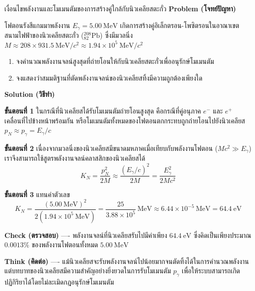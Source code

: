 \begin{psctbox}{เงื่อนไขพลังงานและโมเมนตัมของการสร้างคู่ใกล้กับนิวเคลียสตะกั่ว}
\textbf{Problem (โจทย์ปัญหา)}

โฟตอนรังสีแกมมาพลังงาน $E_\gamma = 5.00~\text{MeV}$ เกิดการสร้างคู่อิเล็กตรอน-โพซิตรอนในอาณาเขตสนามไฟฟ้าของนิวเคลียสตะกั่ว ($^{208}_{82}\text{Pb}$) ซึ่งมีมวลนิ่ง $M \approx 208 \times 931.5~\text{MeV}/c^2 \approx 1.94 \times 10^5~\text{MeV}/c^2$
\begin{enumerate}
    \item จงคำนวณพลังงานจลน์สูงสุดที่ถ่ายโอนให้กับนิวเคลียสตะกั่วเพื่ออนุรักษ์โมเมนตัม
    \item จงแสดงว่าสมมติฐานที่ตัดพลังงานจลน์ของนิวเคลียสทิ้งมีความถูกต้องเพียงใด
\end{enumerate}

\textbf{Solution (วิธีทำ)}

\textbf{ขั้นตอนที่ 1} ในกรณีที่นิวเคลียสได้รับโมเมนตัมถ่ายโอนสูงสุด คือกรณีที่คู่อนุภาค $e^-$ และ $e^+$ เคลื่อนที่ไปข้างหน้าพร้อมกัน หรือโมเมนตัมทั้งหมดของโฟตอนตกกระทบถูกถ่ายโอนไปยังนิวเคลียส $p_N \approx p_\gamma = E_\gamma / c$

\textbf{ขั้นตอนที่ 2} เนื่องจากมวลนิ่งของนิวเคลียสมีขนาดมหภาคเมื่อเทียบกับพลังงานโฟตอน ($M c^2 \gg E_\gamma$) เราจึงสามารถใช้สูตรพลังงานจลน์คลาสสิกของนิวเคลียสได้
\begin{equation*}
K_N = \frac{p_N^2}{2M} \approx \frac{(E_\gamma / c)^2}{2M} = \frac{E_\gamma^2}{2 M c^2}
\end{equation*}

\textbf{ขั้นตอนที่ 3} แทนค่าตัวเลข
\begin{equation*}
K_N = \frac{(5.00~\text{MeV})^2}{2(1.94 \times 10^5~\text{MeV})} = \frac{25}{3.88 \times 10^5}~\text{MeV} \approx 6.44 \times 10^{-5}~\text{MeV} = 64.4~\text{eV}
\end{equation*}

\textbf{Check (ตรวจสอบ)} ---- พลังงานจลน์ที่นิวเคลียสรับไปมีค่าเพียง $64.4~\text{eV}$ ซึ่งคิดเป็นเพียงประมาณ $0.0013\%$ ของพลังงานโฟตอนทั้งหมด $5.00~\text{MeV}$ 

\textbf{Think (คิดต่อ)} ---- แม้นิวเคลียสจะรับพลังงานจลน์ไปน้อยมากจนตัดทิ้งได้ในการคำนวณพลังงาน แต่บทบาทของนิวเคลียสมีความสำคัญอย่างยิ่งยวดในการรับโมเมนตัม $p_\gamma$ เพื่อให้ระบบสามารถเกิดปฏิกิริยาได้โดยไม่ละเมิดกฎอนุรักษ์โมเมนตัม
\end{psctbox}

